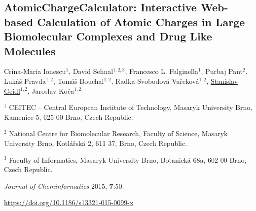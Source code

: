 \begin{center}
\section{\centering AtomicChargeCalculator: Interactive Web-based Calculation
of Atomic Charges in Large Biomolecular Complexes and Drug Like Molecules}

Crina-Maria Ionescu$^1$, David Sehnal$^{1, 2, 3}$, Francesco L. Falginella$^1$,
Purbaj Pant$^2$, Lukáš Pravda$^{1, 2}$, Tomáš Bouchal$^{1, 2}$,
Radka Svobodová Vařeková$^{1, 2}$, \underline{Stanislav Geidl}$^{1, 2}$,
Jaroslav Koča$^{1, 2}$

\vspace{1cm}

$^1$ CEITEC -- Central European Institute of Technology,
Masaryk University Brno, Kamenice 5, 625 00 Brno, Czech Republic.

$^2$ National Centre for Biomolecular Research, Faculty of Science,
Masaryk University Brno, Kotlářská 2, 611 37, Brno, Czech Republic.

$^3$ Faculty of Informatics, Masaryk University Brno, Botanická 68a, 602 00 Brno,
Czech Republic.

\vspace{1cm}

\textit{Journal of Cheminformatics} 2015, \textbf{7}:50.

\vspace{1cm}

\url{https://doi.org/10.1186/s13321-015-0099-x}

\end{center}



